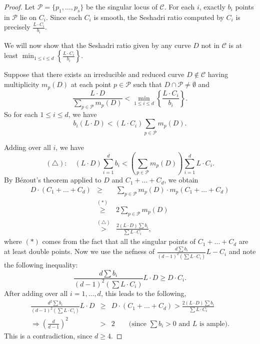 \documentclass[12pt,reqno]{amsart}
\theoremstyle{plain}
\numberwithin{equation}{section}
\theoremstyle{definition}
\begin{document}
	\begin{proof}
	 Let $\mathcal{P} = \{p_{1}, \ldots, p_{s}\}$ be the singular locus of  $\mathcal{C}$. For each $i$, exactly $b_i$ points in $\mathcal{P}$  lie on $C_i$. Since each $C_i$ is smooth, the Seshadri ratio computed by $C_i$ is precisely 
	  $ \frac{L\cdot C_i}{b_i}$. %
	 

  We will now show that the Seshadri ratio given by any curve $D$ not in $\mathcal{C}$ is at least $\min_{1\le i\le d}
  {\left\{\frac{L\cdot C_i}{b_i}\right\}}$. 
  
	 Suppose that there exists an irreducible and reduced curve $D\notin \mathcal{C}$ having multiplicity $m_{p}(D)$ at each point $p \in \mathcal{P}$ such that $D \cap \mathcal{P} \ne \emptyset$ and 
		$$\frac{L \cdot D}{\sum_{p \in \mathcal{P}} m_{p}(D)} < \min_{1\le i \le d}\left\{\frac{L\cdot C_i}{b_i}\right\}.$$
So for each $1 \le i \le d$, we have 
                $$b_i(L \cdot D)  < (L\cdot C_i) \sum_{p \in \mathcal{P}} m_{p}(D).$$ 
                
Adding over all $i$, we have 
		$$(\triangle) : \quad (L \cdot D)\sum_{i=1}^d b_i < \left(\sum_{p \in \mathcal{P}} m_{p}(D)\right)\sum_{i=1}^d L\cdot C_i.$$
		By B\'ezout's theorem applied to $D$ and $C_1+\dots+C_d$, we obtain
		\begin{eqnarray*}
		 D\cdot (C_{1}+ \ldots + C_{d}) &\geq& \sum_{p \in \mathcal{P}}m_{p}(D)\cdot m_{p}(C_{1}+ \ldots + C_{d})\\
		&\stackrel{(*)}{\geq}& 2\sum_{p \in \mathcal{P}} m_{p}(D) \\
		&\stackrel{(\triangle)}{>}& \frac{2(L \cdot D)\sum b_i}{\sum L\cdot C_i},
		\end{eqnarray*}
		where $(*)$ comes from the fact that all the singular points of $C_{1}+ \ldots + C_{d}$ are at least double points. Now we use the nefness 
		of $\frac{d\sum b_i}{(d-1)^2(\sum L\cdot C_i)}L-C_i$ and note the following  inequality: 
		\[
		\frac{d\sum b_i}{(d-1)^2(\sum L\cdot C_i)}L\cdot D \geq D\cdot C_i.
		\] 
		After adding over all $i=1,...,d$, this leads to the following, 
		\begin{eqnarray*}
			\frac{d^2\sum b_i}{(d-1)^2(\sum L\cdot C_i)}L\cdot D &\geq&  D\cdot (C_{1}+ \ldots + C_{d}) > \frac{2(L \cdot D)\sum b_i}{\sum L\cdot C_i} \\
			\Rightarrow \left(\frac{d}{d-1} \right)^2 &>& 2 \quad \quad \text{(since $\sum b_i > 0$ and $L$ is ample)}.
		\end{eqnarray*}
		This is a contradiction, since $d\geq 4$.
	\end{proof}
\end{document}
